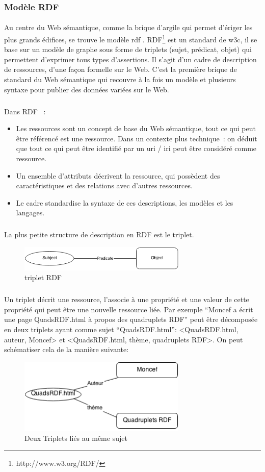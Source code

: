 \documentclass[12pt,a4	]{report}
\begin{document}
\subsubsection*{Modèle RDF}
\paragraph{}
Au centre du Web sémantique, comme la brique d’argile qui permet d’ériger les plus grands édifices, se trouve le modèle \gls{rdf} . RDF\footnote{http://www.w3.org/RDF/} est un standard de \gls{w3c}, il se base sur un modèle de graphe sous forme de triplets (sujet, prédicat, objet) qui permettent d'exprimer tous types d'assertions. Il s’agit d’un cadre de description de ressources, d’une façon formelle sur le Web.
C’est la première brique de standard du Web sémantique qui recouvre à la fois un modèle et plusieurs syntaxe pour publier des données variées sur le Web.
\subparagraph{}
Dans RDF ~:
\newline
\begin{itemize}
\item Les ressources sont un concept de base du Web sémantique, tout ce qui peut être référencé est une ressource. Dans un contexte plus technique~: on déduit que tout ce qui peut être identifié par un \gls{uri} / \gls{iri} peut être considéré comme ressource.
\item Un ensemble d’attributs décrivent la ressource, qui possèdent des caractéristiques et des relations avec d’autres ressources.
\item Le cadre standardise la syntaxe de ces descriptions, les modèles et les langages.
\end{itemize}
\subparagraph{}
La plus petite structure de description en RDF est le triplet.
\begin{figure}[H]
\centering
\centering
\includegraphics[width=8cm]{tripletrdf.png}
\caption{triplet RDF}

\end{figure}
\subparagraph{}
Un triplet décrit une ressource, l’associe à une propriété et une valeur de cette propriété qui peut être une nouvelle ressource liée.
\newline
Par exemple “Moncef a écrit une page QuadsRDF.html à propos des quadruplets RDF” peut être décomposée en deux triplets ayant comme sujet “QuadsRDF.html”: <QuadsRDF.html, auteur, Moncef> et <QuadsRDF.html, thème, quadruplets RDF>.
\newline
On peut schématiser cela de la manière suivante:
\begin{figure}[H]
\centering
\centering
\includegraphics[width=8cm]{Diag.png}
\caption{Deux Triplets liés au même sujet}

\end{figure}
\end{document}
